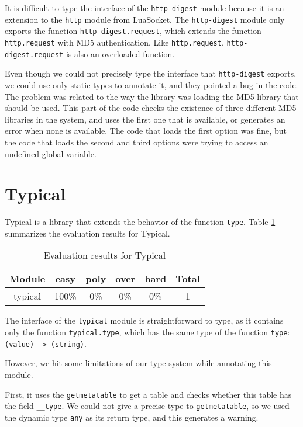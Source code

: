It is difficult to type the interface of the \texttt{http-digest} module
because it is an extension to the \texttt{http} module from LuaSocket.
The \texttt{http-digest} module only exports the function
\texttt{http-digest.request}, which extends the function
\texttt{http.request} with MD5 authentication.
Like \texttt{http.request}, \texttt{http-digest.request}
is also an overloaded function.

Even though we could not precisely type the interface that \texttt{http-digest}
exports, we could use only static types to annotate it, and they pointed a bug
in the code.
The problem was related to the way the library was loading the MD5 library
that should be used. 
This part of the code checks the existence of three different MD5 libraries
in the system, and uses the first one that is available, or generates an
error when none is available.
The code that loads the first option was fine, but the code that loads the
second and third options were trying to access an undefined global variable.

\section{Typical}

Typical is a library that extends the behavior of the function \texttt{type}. 
Table \ref{tab:evaltypical} summarizes the evaluation results for Typical.

\begin{table}[!ht]
\begin{center}
\begin{tabular}{|c|c|c|c|c|c|}
\hline
\textbf{Module} & \textbf{easy} & \textbf{poly} & \textbf{over} & \textbf{hard} & \textbf{Total} \\
\hline
typical & 100\% & 0\% & 0\% & 0\% & 1 \\ %
\hline
\end{tabular}
\end{center}
\caption{Evaluation results for Typical}
\label{tab:evaltypical}
\end{table}

The interface of the \texttt{typical} module is straightforward to type,
as it contains only the function \texttt{typical.type},
which has the same type of the function \texttt{type}: \texttt{(value) -> (string)}.

However, we hit some limitations of our type system while annotating this module.

First, it uses the \texttt{getmetatable} to get a table and
checks whether this table has the field \texttt{\string_\string_type}.
We could not give a precise type to \texttt{getmetatable}, so we used the dynamic
type \texttt{any} as its return type, and this generates a warning.

